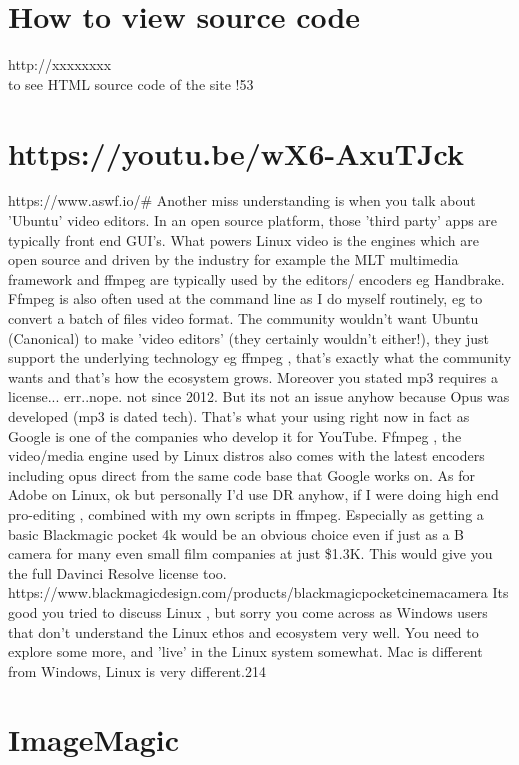 \documentclass[10pt,a4paper]{article}
\begin{document}
{{{{{{{{{{{{{{{\hypertarget{how_to_view_source_code}{\section {How to view source code}}
http://xxxxxxxx\\
to see HTML source code of the site !53
\hypertarget{https://youtu.be/wx6-axutjck}{\section {https://youtu.be/wX6-AxuTJck}}
https://www.aswf.io/\# Another miss understanding is when you talk about 'Ubuntu' video editors. In an open source platform, those 'third party' apps are typically front end GUI's. What powers Linux video is the engines which are open source and driven by the industry for example the MLT multimedia framework and ffmpeg are typically used by the editors/ encoders eg Handbrake. Ffmpeg is also often used at the command line as I do myself routinely, eg to convert a batch of files video format. The community wouldn't want Ubuntu (Canonical) to make 'video editors' (they certainly wouldn't either!), they just support the underlying technology eg ffmpeg , that's exactly what the community wants and that's how the ecosystem grows. Moreover you stated mp3 requires a license... err..nope. not since 2012. But its not an issue anyhow because Opus was developed (mp3 is dated tech). That's what your using right now in fact as Google is one of the companies who develop it for YouTube. Ffmpeg , the video/media engine used by Linux distros also comes with the latest encoders including opus direct from the same code base that Google works on. As for Adobe on Linux, ok but personally I'd use DR anyhow, if I were doing high end pro-editing , combined with my own scripts in ffmpeg. Especially as getting a basic Blackmagic pocket 4k would be an obvious choice even if just as a B camera for many even small film companies at just \$1.3K. This would give you the full Davinci Resolve license too. https://www.blackmagicdesign.com/products/blackmagicpocketcinemacamera  Its good you tried to discuss Linux , but sorry you come across as Windows users that don't understand the Linux ethos and ecosystem very well. You need to explore some more, and 'live' in the Linux system somewhat. Mac is different from Windows, Linux is very different.﻿214
\hypertarget{imagemagic}{\section {ImageMagic}}
}}}}}}}}}}}}}}}
\end{document}
